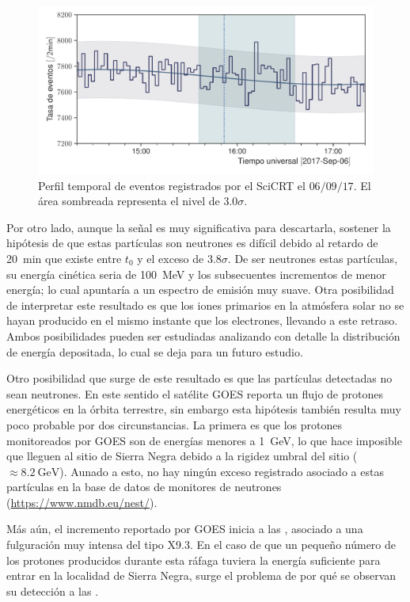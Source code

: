 \begin{figure}
        \centering
        \includegraphics[width=\textwidth]{neutron-170906.pdf}
        \caption{Perfil temporal de eventos registrados por el SciCRT el $06/09/17$. El área sombreada representa el nivel de $3.0\sigma$.}
        \label{fig:september-06-neutrons}
\end{figure}

Por otro lado, aunque la señal es muy significativa para descartarla, sostener la hipótesis de que estas partículas son neutrones es difícil debido al retardo de \SI{20}{\minute} que existe entre $t_{0}$ y el exceso de $3.8\sigma$. De ser neutrones estas partículas, su energía cinética seria de \SI{100}{\mega\electronvolt} y los subsecuentes incrementos de menor energía; lo cual apuntaría a un espectro de emisión muy suave. Otra posibilidad de interpretar este resultado es que los iones primarios en la atmósfera solar no se hayan producido en el mismo instante que los electrones, llevando a este retraso. Ambos posibilidades pueden ser estudiadas analizando con detalle la distribución de energía depositada, lo cual se deja para un futuro estudio.

Otro posibilidad que surge de este resultado es que las partículas detectadas no sean neutrones. En este sentido el satélite GOES reporta un flujo de protones energéticos en la órbita terrestre, sin embargo esta hipótesis también resulta muy poco probable por dos circunstancias. La primera es que los protones monitoreados por GOES son de energías menores a \SI{1}{\giga\electronvolt}, lo que hace imposible que lleguen al sitio de Sierra Negra debido a la rigidez umbral del sitio ($\approx\SI{8.2}{\giga\electronvolt}$). Aunado a esto, no hay ningún exceso registrado asociado a estas partículas en la base de datos de monitores de neutrones (\url{https://www.nmdb.eu/nest/}).

Más aún, el incremento reportado por GOES inicia a las , asociado a una fulguración muy intensa del tipo X\num{9.3}. En el caso de que un pequeño número de los protones producidos durante esta ráfaga tuviera la energía suficiente para entrar en la localidad de Sierra Negra, surge el problema de por qué se observan su detección a las .

